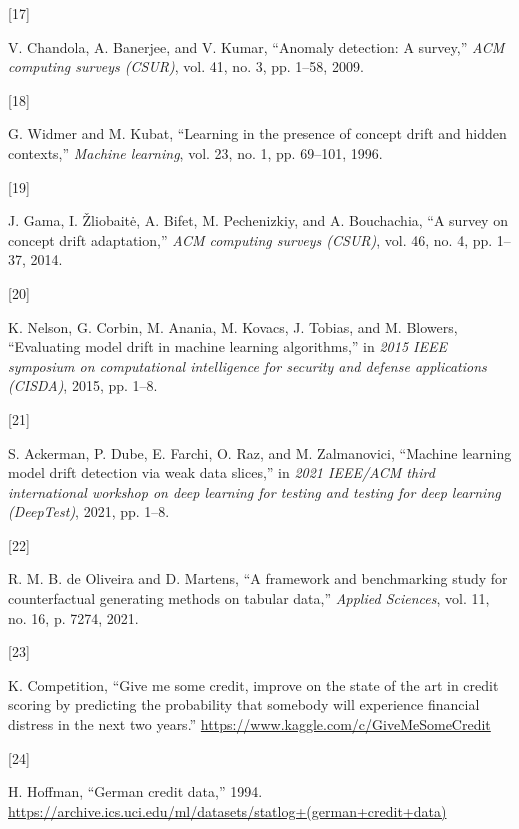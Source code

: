 \documentclass[
  conference]{IEEEtran}
\newlength{\cslhangindent}
\newlength{\csllabelwidth}
\newlength{\cslentryspacingunit} %
\newenvironment{CSLReferences}[2] %
 {%
  \setlength{\parindent}{0pt}
  \ifodd #1
  \let\oldpar\par
  \def\par{\hangindent=\cslhangindent\oldpar}
  \fi
  \setlength{\parskip}{#2\cslentryspacingunit}
 }%
 {}
\newcommand{\CSLLeftMargin}[1]{\parbox[t]{\csllabelwidth}{#1}}
\newcommand{\CSLRightInline}[1]{\parbox[t]{\linewidth - \csllabelwidth}{#1}\break}
\begin{document}
\begin{CSLReferences}{0}{0}
\leavevmode{}%
\CSLLeftMargin{{[}17{]} }%
\CSLRightInline{V. Chandola, A. Banerjee, and V. Kumar, {``Anomaly
detection: A survey,''} \emph{ACM computing surveys (CSUR)}, vol. 41,
no. 3, pp. 1--58, 2009.}

\leavevmode{}%
\CSLLeftMargin{{[}18{]} }%
\CSLRightInline{G. Widmer and M. Kubat, {``Learning in the presence of
concept drift and hidden contexts,''} \emph{Machine learning}, vol. 23,
no. 1, pp. 69--101, 1996.}

\leavevmode{}%
\CSLLeftMargin{{[}19{]} }%
\CSLRightInline{J. Gama, I. Žliobaitė, A. Bifet, M. Pechenizkiy, and A.
Bouchachia, {``A survey on concept drift adaptation,''} \emph{ACM
computing surveys (CSUR)}, vol. 46, no. 4, pp. 1--37, 2014.}

\leavevmode{}%
\CSLLeftMargin{{[}20{]} }%
\CSLRightInline{K. Nelson, G. Corbin, M. Anania, M. Kovacs, J. Tobias,
and M. Blowers, {``Evaluating model drift in machine learning
algorithms,''} in \emph{2015 IEEE symposium on computational
intelligence for security and defense applications (CISDA)}, 2015, pp.
1--8.}

\leavevmode{}%
\CSLLeftMargin{{[}21{]} }%
\CSLRightInline{S. Ackerman, P. Dube, E. Farchi, O. Raz, and M.
Zalmanovici, {``Machine learning model drift detection via weak data
slices,''} in \emph{2021 IEEE/ACM third international workshop on deep
learning for testing and testing for deep learning (DeepTest)}, 2021,
pp. 1--8.}

\leavevmode{}%
\CSLLeftMargin{{[}22{]} }%
\CSLRightInline{R. M. B. de Oliveira and D. Martens, {``A framework and
benchmarking study for counterfactual generating methods on tabular
data,''} \emph{Applied Sciences}, vol. 11, no. 16, p. 7274, 2021.}

\leavevmode{}%
\CSLLeftMargin{{[}23{]} }%
\CSLRightInline{K. Competition, {``Give me some credit, improve on the
state of the art in credit scoring by predicting the probability that
somebody will experience financial distress in the next two years.''}
\url{https://www.kaggle.com/c/GiveMeSomeCredit}}

\leavevmode{}%
\CSLLeftMargin{{[}24{]} }%
\CSLRightInline{H. Hoffman, {``German credit data,''} 1994.
\url{https://archive.ics.uci.edu/ml/datasets/statlog+(german+credit+data)}}


\end{CSLReferences}
\end{document}
